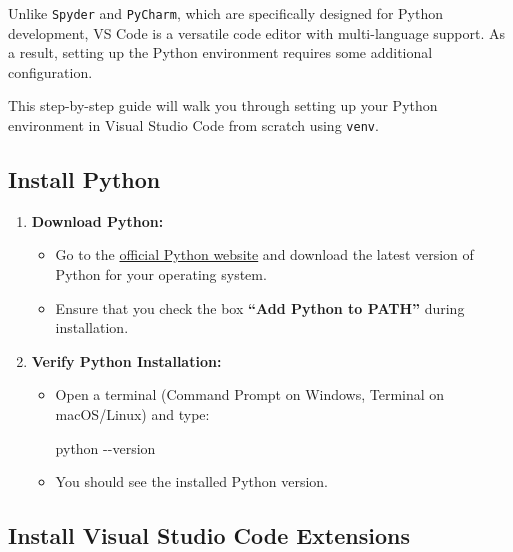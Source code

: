 \documentclass[
  letterpaper,
  DIV=11,
  numbers=noendperiod]{scrreprt}
\newenvironment{Shaded}{\begin{snugshade}}{\end{snugshade}}
\newcommand{\AttributeTok}[1]{\textcolor[rgb]{0.40,0.45,0.13}{#1}}
\newcommand{\ExtensionTok}[1]{\textcolor[rgb]{0.00,0.23,0.31}{#1}}
\providecommand{\tightlist}{%
  \setlength{\itemsep}{0pt}\setlength{\parskip}{0pt}}\usepackage{longtable,booktabs,array}
\begin{document}
Unlike \texttt{Spyder} and \texttt{PyCharm}, which are specifically
designed for Python development, VS Code is a versatile code editor with
multi-language support. As a result, setting up the Python environment
requires some additional configuration.

This step-by-step guide will walk you through setting up your Python
environment in Visual Studio Code from scratch using \texttt{venv}.

\hypertarget{install-python}{%
\subsection{Install Python}\label{install-python}}

\begin{enumerate}
\def\labelenumi{\arabic{enumi}.}
\tightlist
\item
  \textbf{Download Python:}

  \begin{itemize}
  \tightlist
  \item
    Go to the \href{https://www.python.org/downloads/}{official Python
    website} and download the latest version of Python for your
    operating system.
  \item
    Ensure that you check the box \textbf{``Add Python to PATH''} during
    installation.
  \end{itemize}
\item
  \textbf{Verify Python Installation:}

  \begin{itemize}
  \item
    Open a terminal (Command Prompt on Windows, Terminal on macOS/Linux)
    and type:

\begin{Shaded}
\begin{Highlighting}[]
\ExtensionTok{python} \AttributeTok{{-}{-}version}
\end{Highlighting}
\end{Shaded}
  \item
    You should see the installed Python version.
  \end{itemize}
\end{enumerate}

\hypertarget{install-visual-studio-code-extensions}{%
\subsection{Install Visual Studio Code
Extensions}\label{install-visual-studio-code-extensions}}
\end{document}
